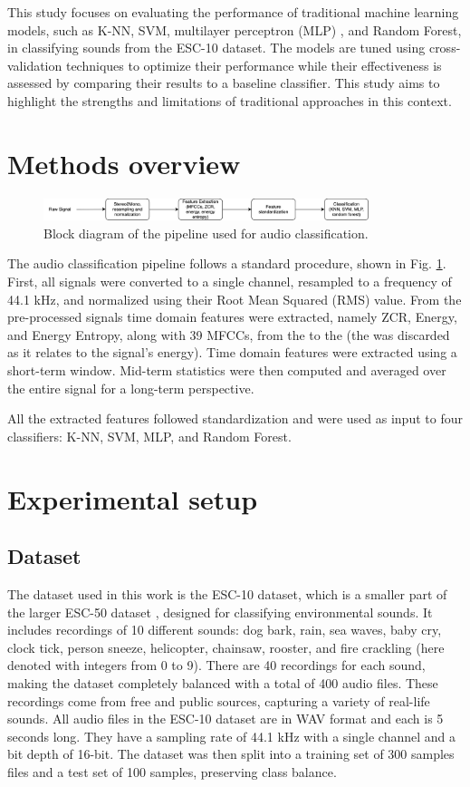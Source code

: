 \documentclass[journal]{IEEEtran}
\begin{document}
This study focuses on evaluating the performance of traditional machine learning models, such as K-NN, SVM, multilayer perceptron (MLP) , and Random Forest, in classifying sounds from the ESC-10 dataset. The models are tuned using cross-validation techniques to optimize their performance while their effectiveness is assessed by comparing their results to a baseline classifier. This study aims to highlight the strengths and limitations of traditional approaches in this context.

\section{Methods overview}

\begin{figure}[h]
    \centering
    \includegraphics[width=\linewidth, height=0.65cm]{pipeline.png}
    \caption{Block diagram of the pipeline used for audio classification.}
    \label{fig:pipeling}
\end{figure}

The audio classification pipeline follows a standard procedure, shown in Fig. \ref{fig:pipeling}. First, all signals were converted to a single channel, resampled to a frequency of 44.1 kHz, and normalized using their Root Mean Squared (RMS) value. From the pre-processed signals time domain features were extracted, namely ZCR, Energy, and Energy Entropy, along with 39 MFCCs, from the  to the  (the  was discarded as it relates to the signal's energy). Time domain features were extracted using a short-term window. Mid-term statistics were then computed and averaged over the entire signal for a long-term perspective.

All the extracted features followed standardization and were used as input to four classifiers: K-NN, SVM, MLP, and Random Forest.

\section{Experimental setup}
\subsection{Dataset}
The dataset used in this work is the ESC-10 dataset, which is a smaller part of the larger ESC-50 dataset \cite{esc-50}, designed for classifying environmental sounds. It includes recordings of 10 different sounds: dog bark, rain, sea waves, baby cry, clock tick, person sneeze, helicopter, chainsaw, rooster, and fire crackling (here denoted with integers from 0 to 9). There are 40 recordings for each sound, making the dataset completely balanced with a total of 400 audio files. These recordings come from free and public sources, capturing a variety of real-life sounds. All audio files in the ESC-10 dataset are in WAV format and each is 5 seconds long. They have a sampling rate of 44.1 kHz with a single channel and a bit depth of 16-bit.
The dataset was then split into a training set of 300 samples files and a test set of 100 samples, preserving class balance.
\end{document}
